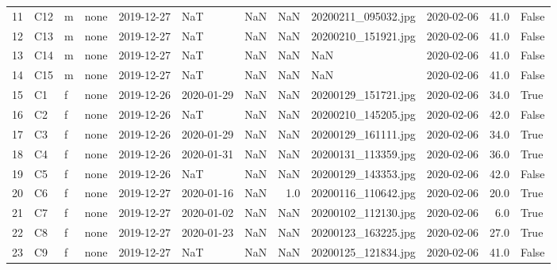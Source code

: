 \begin{longtable}{llllllrrllrl}
11 &    C12 &   m &       none &   2019-12-27 &        NaT &               NaN &                  NaN &      20200211\_095032.jpg &        2020-02-06 &  41.0 &  False \\
12 &    C13 &   m &       none &   2019-12-27 &        NaT &               NaN &                  NaN &      20200210\_151921.jpg &        2020-02-06 &  41.0 &  False \\
13 &    C14 &   m &       none &   2019-12-27 &        NaT &               NaN &                  NaN &                      NaN &        2020-02-06 &  41.0 &  False \\
14 &    C15 &   m &       none &   2019-12-27 &        NaT &               NaN &                  NaN &                      NaN &        2020-02-06 &  41.0 &  False \\
15 &     C1 &   f &       none &   2019-12-26 & 2020-01-29 &               NaN &                  NaN &      20200129\_151721.jpg &        2020-02-06 &  34.0 &   True \\
16 &     C2 &   f &       none &   2019-12-26 &        NaT &               NaN &                  NaN &      20200210\_145205.jpg &        2020-02-06 &  42.0 &  False \\
17 &     C3 &   f &       none &   2019-12-26 & 2020-01-29 &               NaN &                  NaN &      20200129\_161111.jpg &        2020-02-06 &  34.0 &   True \\
18 &     C4 &   f &       none &   2019-12-26 & 2020-01-31 &               NaN &                  NaN &      20200131\_113359.jpg &        2020-02-06 &  36.0 &   True \\
19 &     C5 &   f &       none &   2019-12-26 &        NaT &               NaN &                  NaN &      20200129\_143353.jpg &        2020-02-06 &  42.0 &  False \\
20 &     C6 &   f &       none &   2019-12-27 & 2020-01-16 &               NaN &                  1.0 &      20200116\_110642.jpg &        2020-02-06 &  20.0 &   True \\
21 &     C7 &   f &       none &   2019-12-27 & 2020-01-02 &               NaN &                  NaN &      20200102\_112130.jpg &        2020-02-06 &   6.0 &   True \\
22 &     C8 &   f &       none &   2019-12-27 & 2020-01-23 &               NaN &                  NaN &      20200123\_163225.jpg &        2020-02-06 &  27.0 &   True \\
23 &     C9 &   f &       none &   2019-12-27 &        NaT &               NaN &                  NaN &      20200125\_121834.jpg &        2020-02-06 &  41.0 &  False \\

\end{longtable}
